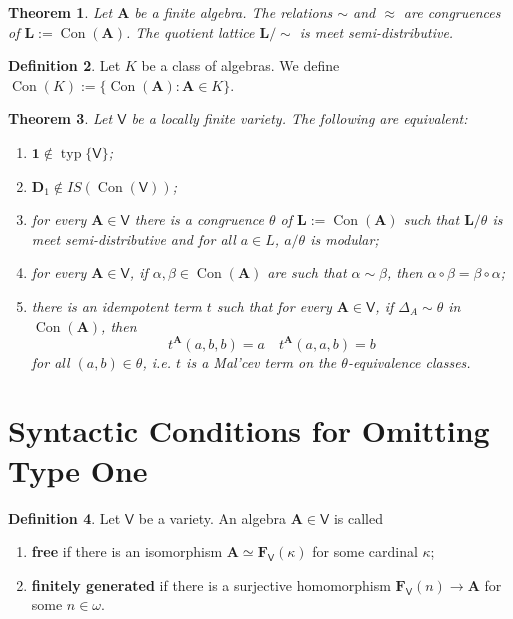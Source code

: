 \documentclass{amsart}
\theoremstyle{plain}
\newtheorem{theorem}{Theorem}[section]
\theoremstyle{definition}
\newtheorem{definition}[theorem]{Definition}
\theoremstyle{remark}
\DeclareMathOperator{\Con}{Con}
\DeclareMathOperator{\typ}{typ}
\begin{document}
\begin{theorem}
    \label{lemma_msd}
    Let $\mathbf{A}$ be a finite algebra. 
    The relations $\sim$ and $\approx$ are congruences of $\mathbf{L}:=\Con(\mathbf{A})$. 
    The quotient lattice $\mathbf{L}/\sim$ is meet semi-distributive. 
\end{theorem}

\begin{definition}
    Let $K$ be a class of algebras.
    We define $\Con(K):=\{\Con(\mathbf{A}) : \mathbf{A} \in K\}$. 
\end{definition}

\begin{theorem}
    \label{theorem_msd}
    Let $\mathsf{V}$ be a locally finite variety.
    The following are equivalent: 
    \begin{enumerate}
        \item $\mathbf{1} \notin \typ\{\mathsf{V}\}$; 
        \item $\mathbf{D}_1 \notin IS(\Con(\mathsf{V}))$;
        \item for every $\mathbf{A} \in \mathsf{V}$ there is a congruence $\theta$ of $\mathbf{L}:=\Con(\mathbf{A})$ such that 
        $\mathbf{L}/\theta$ is meet semi-distributive and for all $a \in L$, $a / \theta$ is modular; 
        \item for every $\mathbf{A} \in \mathsf{V}$, if $\alpha, \beta \in \Con(\mathbf{A})$ are such that $\alpha \sim \beta$, then $\alpha \circ \beta = \beta \circ \alpha$; 
        \item there is an idempotent term $t$ such that for every $\mathbf{A} \in \mathsf{V}$, if $\Delta_A \sim \theta$ in $\Con(\mathbf{A})$, then
        \begin{equation*}
            t^\mathbf{A}(a,b,b)=a \quad t^{\mathbf{A}}(a,a,b)=b 
        \end{equation*}
        for all $(a,b) \in \theta$, i.e. $t$ is a Mal'cev term on the $\theta$-equivalence classes. 
    \end{enumerate}
\end{theorem}


\section{Syntactic Conditions for Omitting Type One}

\begin{definition}
    Let $\mathsf{V}$ be a variety. 
    An algebra $\mathbf{A} \in \mathsf{V}$ is called
    \begin{enumerate}
        \item \textbf{free} if there is an isomorphism $\mathbf{A} \simeq \mathbf{F}_{\mathsf{V}}(\kappa)$ for some cardinal $\kappa$; 
        \item \textbf{finitely generated} if there is a surjective homomorphism $\mathbf{F}_{\mathsf{V}}(n) \to \mathbf{A}$ for some $n \in \omega$. 
    \end{enumerate} 
\end{definition}
\end{document}
